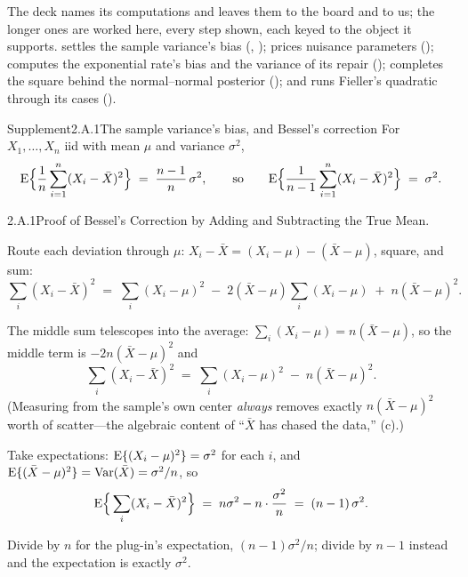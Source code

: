 \documentclass[main.tex]{subfiles}
\begin{document}
The deck names its computations and leaves them to the board and to us; the longer ones are
worked here, every step shown, each keyed to the object it supports.  settles
the sample variance's bias (, );  prices nuisance
parameters ();  computes the exponential rate's bias and the
variance of its repair ();  completes the square behind the
normal--normal posterior (); and  runs Fieller's quadratic through
its cases ().

\begin{ObjL}{Supplement}{2.A.1}{The sample variance's bias, and Bessel's correction}
For $X_1,\dots,X_n$ iid with mean $\mu$ and variance $\sigma^2$,
\[ \mathrm{E}\Big\{ \frac1n \sum_{i=1}^n (X_i-\bar X)^2 \Big\} \;=\; \frac{n-1}{n}\,\sigma^2 ,
   \qquad\text{so}\qquad
   \mathrm{E}\Big\{ \frac{1}{n-1} \sum_{i=1}^n (X_i-\bar X)^2 \Big\} \;=\; \sigma^2 . \]
\end{ObjL}
\begin{Prf}{2.A.1}{Proof of Bessel's Correction by Adding and Subtracting the True Mean.}{}
\item Route each deviation through $\mu$: $X_i-\bar X=(X_i-\mu)-(\bar X-\mu)$, square, and
      sum:
      \[ \sum_i (X_i-\bar X)^2 \;=\; \sum_i (X_i-\mu)^2
         \;-\; 2(\bar X-\mu)\sum_i (X_i-\mu) \;+\; n(\bar X-\mu)^2 . \]
\item The middle sum telescopes into the average: $\sum_i (X_i-\mu)=n(\bar X-\mu)$, so the
      middle term is $-2n(\bar X-\mu)^2$ and
      \[ \sum_i (X_i-\bar X)^2 \;=\; \sum_i (X_i-\mu)^2 \;-\; n(\bar X-\mu)^2 . \]
      (Measuring from the sample's own center \emph{always} removes exactly
      $n(\bar X-\mu)^2$ worth of scatter---the algebraic content of ``$\bar X$ has chased
      the data,'' (c).)
\item Take expectations: $\mathrm{E}\{(X_i-\mu)^2\}=\sigma^2$ for each $i$, and
      $\mathrm{E}\{(\bar X-\mu)^2\}=\operatorname{Var}(\bar X)=\sigma^2/n$, so
      \[ \mathrm{E}\Big\{\sum_i (X_i-\bar X)^2\Big\} \;=\; n\sigma^2 - n\cdot\frac{\sigma^2}{n}
         \;=\; (n-1)\,\sigma^2 . \]
\item Divide by $n$ for the plug-in's expectation, $(n-1)\sigma^2/n$; divide by $n-1$
      instead and the expectation is exactly $\sigma^2$.
\end{Prf}
\end{document}
